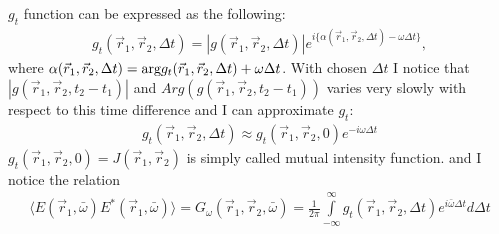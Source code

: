     $g_t$ function can be expressed as the following:
    \begin{align}
        g_t(\vec{r}_1, \vec{r}_2, \Delta t) = |g(\vec{r}_1, \vec{r}_2, \Delta t)|e^{i \{\alpha(\vec{r}_1, \vec{r}_2, \Delta t) - \omega \Delta t\}}, 
    \end{align}
    where $\alpha(\vec{r}_1, \vec{r}_2, \Delta t) = \textup{arg} g_t(\vec{r}_1, \vec{r}_2, \Delta t) + \omega \Delta t$. With chosen $\Delta t$ I notice that $|g(\vec{r}_1, \vec{r}_2, t_2 - t_1)|$ and $Arg(g(\vec{r}_1, \vec{r}_2, t_2 - t_1))$ varies very slowly with respect to this time difference and I can approximate $g_t$:
    \begin{align}
        g_t(\vec{r}_1, \vec{r}_2, \Delta t) \approx g_t(\vec{r}_1, \vec{r}_2, 0) e^{-i \omega \Delta t}
    \end{align}
    $g_t(\vec{r}_1, \vec{r}_2, 0) = J(\vec{r}_1, \vec{r}_2)$ is simply called mutual intensity function.
    and I notice the relation 
    \begin{align}
        \langle E(\vec{r}_1, \bar{\omega})E^*(\vec{r}_1, \bar{\omega})\rangle = G_{\omega}(\vec{r}_1, \vec{r}_2, \bar{\omega}) = \frac{1}{2 \pi} \int \limits_{-\infty}^{\infty}  g_t(\vec{r}_1, \vec{r}_2, \Delta t) e^{i \bar{\omega} \Delta t} d \Delta t
    \end{align} 